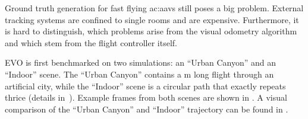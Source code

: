 Ground truth generation for fast flying \glspl{ac:aav} still poses a big problem.
External tracking systems are confined to single rooms and are expensive.
Furthermore, it is hard to distinguish, which problems arise from the visual odometry algorithm and which stem from the flight controller itself.

EVO is first benchmarked on two simulations: an ``Urban Canyon'' and an ``Indoor'' scene. 
The ``Urban Canyon'' contains a \unit[400]{m} long flight through an artificial city, while the ``Indoor'' scene is a circular path that exactly repeats thrice (details in~\cite{zhang2016benefit}). 
Example frames from both scenes are shown in .
A visual comparison of the ``Urban Canyon'' and ``Indoor'' trajectory can be found in .

